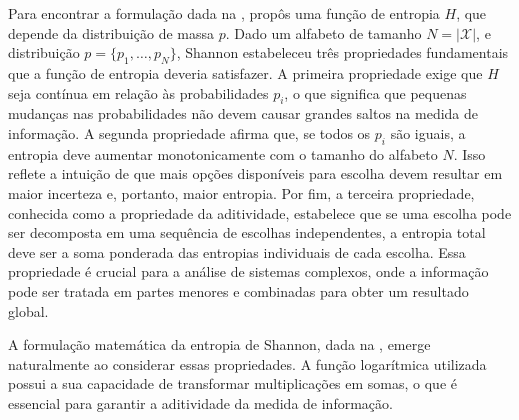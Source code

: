 Para encontrar a formulação dada na ,
\textcite{shannon1948} propôs uma função de entropia $H$, que depende da
distribuição de massa $p$. Dado um alfabeto de tamanho $N = |\mathcal{X}|$, e
distribuição $p = \{p_1,\ldots,p_N\}$, Shannon estabeleceu três propriedades
fundamentais que a função de entropia deveria satisfazer. A primeira
propriedade exige que $H$ seja contínua em relação às probabilidades $p_i$, o
que significa que pequenas mudanças nas probabilidades não devem causar grandes
saltos na medida de informação. A segunda propriedade afirma que, se todos os
$p_i$ são iguais, a entropia deve aumentar monotonicamente com o tamanho do
alfabeto $N$. Isso reflete a intuição de que mais opções disponíveis para
escolha devem resultar em maior incerteza e, portanto, maior entropia. Por fim,
a terceira propriedade, conhecida como a propriedade da aditividade, estabelece
que se uma escolha pode ser decomposta em uma sequência de escolhas
independentes, a entropia total deve ser a soma ponderada das entropias
individuais de cada escolha. Essa propriedade é crucial para a análise de
sistemas complexos, onde a informação pode ser tratada em partes menores e
combinadas para obter um resultado global.

A formulação matemática da entropia de Shannon, dada na ,
emerge naturalmente ao considerar essas propriedades. A função
logarítmica utilizada possui a sua capacidade de transformar multiplicações em
somas, o que é essencial para garantir a aditividade da medida de informação.

